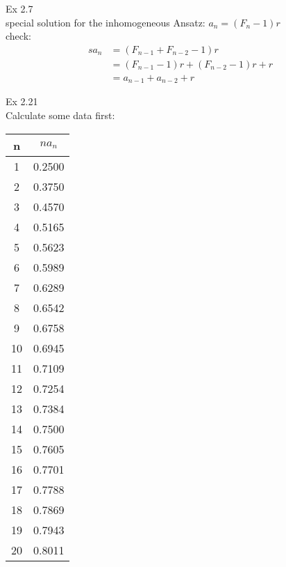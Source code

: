 \documentclass{article}
\begin{document}
  

Ex 2.7\\
special solution for the inhomogeneous
Ansatz: $a_n = (F_n - 1)r$\\
check: 
\begin{align*}s
	a_n &= (F_{n-1} + F_{n-2} -1) r\\
		&= (F_{n-1}-1)r + (F_{n-2} - 1)r + r\\
		&= a_{n-1} + a_{n-2} + r
\end{align*}

Ex 2.21\\
Calculate some data first:
\begin{center}
 \begin{tabular}{||c c||} 
 \hline
 n & $na_n$\\ [0.5ex] 
 \hline\hline
 1 & 0.2500\\
  2 & 0.3750\\
  3 & 0.4570\\
  4 & 0.5165\\
  5 & 0.5623\\
  6 & 0.5989\\
  7 & 0.6289\\
  8 & 0.6542\\
  9 & 0.6758\\
 10 & 0.6945\\
 11 & 0.7109\\
 12 & 0.7254\\
 13 & 0.7384\\
 14 & 0.7500\\
 15 & 0.7605\\
 16 & 0.7701\\
 17 & 0.7788\\
 18 & 0.7869\\
 19 & 0.7943\\
 20 & 0.8011\\ [1ex] 
 \hline
\end{tabular}
\end{center}
\end{document}
